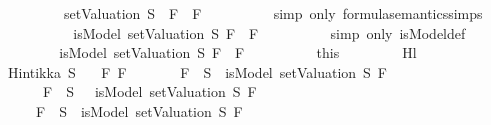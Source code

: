 \begin{isabellebody}
\ \ \ \ \ \ \ \ \ \ {\isacharparenleft}{\isasymnot}\ {\isacharparenleft}{\isacharparenleft}setValuation\ S{\isacharparenright}\ {\isasymTurnstile}\ {\isacharparenleft}F{}\ \isactrlbold {\isasymand}\ F{}{\isacharparenright}{\isacharparenright}{\isacharparenright}{\isachardoublequoteclose}\isanewline
\ \ \ \ \ \ \ \ \isamarkupfalse%
\ {\isacharparenleft}simp\ only{\isacharcolon}\ formula{\isacharunderscore}semantics{\isachardot}simps{\isacharparenleft}{}{\isacharparenright}{\isacharparenright}\isanewline
\ \ \ \ \ \ \isamarkupfalse%
\ \isamarkupfalse%
\ {\isachardoublequoteopen}{\isasymdots}\ {\isacharequal}\ {\isacharparenleft}{\isasymnot}\ isModel\ {\isacharparenleft}setValuation\ S{\isacharparenright}\ {\isacharparenleft}F{}\ \isactrlbold {\isasymand}\ F{}{\isacharparenright}{\isacharparenright}{\isachardoublequoteclose}\isanewline
\ \ \ \ \ \ \ \ \isamarkupfalse%
\ {\isacharparenleft}simp\ only{\isacharcolon}\ isModel{\isacharunderscore}def{\isacharparenright}\isanewline
\ \ \ \ \ \ \isamarkupfalse%
\ \isamarkupfalse%
\ {\isachardoublequoteopen}{\isasymnot}\ isModel\ {\isacharparenleft}setValuation\ S{\isacharparenright}\ {\isacharparenleft}F{}\ \isactrlbold {\isasymand}\ F{}{\isacharparenright}{\isachardoublequoteclose}\isanewline
\ \ \ \ \ \ \ \ \isamarkupfalse%
\ this\isanewline
\ \ \ \ \isamarkupfalse%
\isanewline
\ \ \isamarkupfalse%
\isanewline
{}\isamarkupfalse%
%
\endisatagproof
{\isafoldproof}%
%
\isadelimproof
\isanewline
%
\endisadelimproof
\isanewline
{}\isamarkupfalse%
\ Hl{}{\isacharunderscore}{}{\isacharcolon}\isanewline
\ \ \ {\isachardoublequoteopen}Hintikka\ S{\isachardoublequoteclose}\isanewline
\ \ \ {\isachardoublequoteopen}{\isasymAnd}F{}\ F{}{\isachardot}\isanewline
\ \ \ \ \ \ \ {\isacharparenleft}F{}\ {\isasymin}\ S\ {\isasymlongrightarrow}\ isModel\ {\isacharparenleft}setValuation\ S{\isacharparenright}\ F{}{\isacharparenright}\ {\isasymand}\isanewline
\ \ \ \ \ \ \ {\isacharparenleft}\isactrlbold {\isasymnot}\ F{}\ {\isasymin}\ S\ {\isasymlongrightarrow}\ {\isasymnot}\ isModel\ {\isacharparenleft}setValuation\ S{\isacharparenright}\ F{}{\isacharparenright}\ {\isasymLongrightarrow}\isanewline
\ \ \ \ \ \ \ {\isacharparenleft}F{}\ {\isasymin}\ S\ {\isasymlongrightarrow}\ isModel\ {\isacharparenleft}setValuation\ S{\isacharparenright}\ F{}{\isacharparenright}\ {\isasymand}\isanewline

\end{isabellebody}
